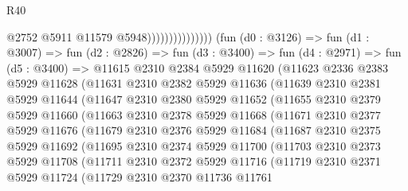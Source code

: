 \begin{lexlean}{R40}
\begin{coremodule}
                                      @2752
                                      @5911
                                      @11579
                                      @5948)))))))))))))))
        (fun (d0 : @3126) =>
        fun (d1 : @3007) =>
        fun (d2 : @2826) =>
        fun (d3 : @3400) =>
        fun (d4 : @2971) =>
        fun (d5 : @3400) =>
        @11615
          @2310
          @2384
          @5929
          @11620
          (@11623
            @2336
            @2383
            @5929
            @11628
            (@11631
              @2310
              @2382
              @5929
              @11636
              (@11639
                @2310
                @2381
                @5929
                @11644
                (@11647
                  @2310
                  @2380
                  @5929
                  @11652
                  (@11655
                    @2310
                    @2379
                    @5929
                    @11660
                    (@11663
                      @2310
                      @2378
                      @5929
                      @11668
                      (@11671
                        @2310
                        @2377
                        @5929
                        @11676
                        (@11679
                          @2310
                          @2376
                          @5929
                          @11684
                          (@11687
                            @2310
                            @2375
                            @5929
                            @11692
                            (@11695
                              @2310
                              @2374
                              @5929
                              @11700
                              (@11703
                                @2310
                                @2373
                                @5929
                                @11708
                                (@11711
                                  @2310
                                  @2372
                                  @5929
                                  @11716
                                  (@11719
                                    @2310
                                    @2371
                                    @5929
                                    @11724
                                    (@11729
                                      @2310
                                      @2370
                                      @11736
                                      @11761

\end{coremodule}
\end{lexlean}

